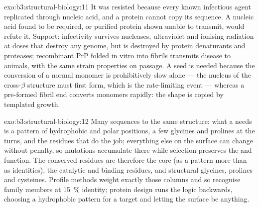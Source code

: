 \begin{solution}{exo:b3:structural-biology:11}
It was resisted because every known infectious agent replicated
through nucleic acid, and a protein cannot copy its sequence. A
nucleic acid found to be required, or purified protein shown unable to
transmit, would refute it. Support: infectivity survives nucleases,
ultraviolet and ionising radiation at doses that destroy any genome,
but is destroyed by protein denaturants and proteases; recombinant
PrP folded in vitro into fibrils transmits disease to animals, with
the same strain properties on passage. A seed is needed because the
conversion of a normal monomer is prohibitively slow alone --- the
nucleus of the cross-$\beta$ structure must first form, which is the
rate-limiting event --- whereas a pre-formed fibril end converts
monomers rapidly: the shape is copied by templated growth.
\end{solution}

\begin{solution}{exo:b3:structural-biology:12}
Many sequences  to the same structure: what a  needs is a
pattern of hydrophobic and polar positions, a few glycines and prolines
at the turns, and the residues that do the job; everything else on the
surface can change without penalty, so mutations accumulate there while
selection preserves the  and function. The conserved residues are
therefore the core (as a pattern more than as identities), the
catalytic and binding residues, and structural glycines, prolines and
cysteines. Profile methods weight exactly those columns and so
recognise family members at \qty{15}{\%} identity; protein design runs
the logic backwards, choosing a hydrophobic pattern for a target 
and letting the surface be anything.
\end{solution}

